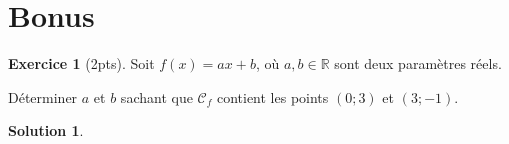 \documentclass[a4paper, 14pt]{extarticle}
\theoremstyle{plain}
\newtheorem*{sol}{Solution}
\theoremstyle{definition}
\newtheorem{ex}{Exercice}
\newcommand{\C}{\mathcal{C}}
\newcommand{\R}{\mathbb{R}}
\newcommand{\exe}[2]{
		\begin{ex} #1  \end{ex}
		\begin{sol} #2 \end{sol}
	}
\newcommand{\exe}[2]{
		\begin{ex} #1  \end{ex}
	}
\begin{document}
\section*{Bonus}

	\exe{[2pts]
		Soit $f(x) = ax + b$, où $a,b\in\R$ sont deux paramètres réels.
		
		Déterminer $a$ et $b$ sachant que $\C_f$ contient les points $(0;3)$ et $(3;-1)$.
	}{}

\end{document}
